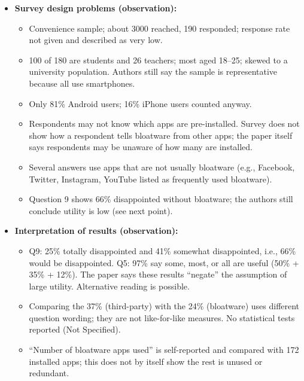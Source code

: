 \documentclass[11pt,a4paper]{article}
\begin{document}
\begin{enumerate}
\begin{itemize}[leftmargin=*, itemsep=1pt, topsep=2pt]
\begin{itemize}[itemsep=0pt]
            \item Many Haier, Panasonic, and old models with low market share (observation); firmware from a third-party site.
            \item Carrier-specific and region-specific bloatware not discussed (observation).
        \end{itemize}
        \item \textbf{Survey design problems (observation):}
        \begin{itemize}[itemsep=0pt]
            \item Convenience sample; about 3000 reached, 190 responded; response rate not given and described as very low.
            \item 100 of 180 are students and 26 teachers; most aged 18--25; skewed to a university population. Authors still say the sample is representative because all use smartphones.
            \item Only 81\% Android users; 16\% iPhone users counted anyway.
            \item Respondents may not know which apps are pre-installed. Survey does not show how a respondent tells bloatware from other apps; the paper itself says respondents may be unaware of how many are installed.
            \item Several answers use apps that are not usually bloatware (e.g., Facebook, Twitter, Instagram, YouTube listed as frequently used bloatware).
            \item Question 9 shows 66\% disappointed without bloatware; the authors still conclude utility is low (see next point).
        \end{itemize}
        \item \textbf{Interpretation of results (observation):}
        \begin{itemize}[itemsep=0pt]
            \item Q9: 25\% totally disappointed and 41\% somewhat disappointed, i.e., 66\% would be disappointed. Q5: 97\% say some, most, or all are useful (50\% + 35\% + 12\%). The paper says these results ``negate'' the assumption of large utility. Alternative reading is possible.
            \item Comparing the 37\% (third-party) with the 24\% (bloatware) uses different question wording; they are not like-for-like measures. No statistical tests reported (Not Specified).
            \item ``Number of bloatware apps used'' is self-reported and compared with 172 installed apps; this does not by itself show the rest is unused or redundant.

\end{itemize}
\end{itemize}
\end{enumerate}
\end{document}
